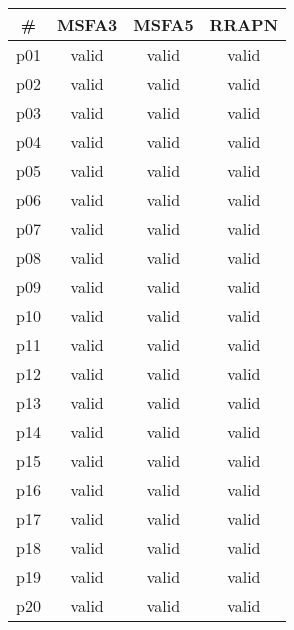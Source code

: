 \begin{tabular}{c||c|c|c}
\textbf{\#} & \textbf{MSFA3} & \textbf{MSFA5} & \textbf{RRAPN}\\
\hline
\hline
p01 & valid & valid & valid\\
p02 & valid & valid & valid\\
p03 & valid & valid & valid\\
p04 & valid & valid & valid\\
p05 & valid & valid & valid\\
p06 & valid & valid & valid\\
p07 & valid & valid & valid\\
p08 & valid & valid & valid\\
p09 & valid & valid & valid\\
p10 & valid & valid & valid\\
p11 & valid & valid & valid\\
p12 & valid & valid & valid\\
p13 & valid & valid & valid\\
p14 & valid & valid & valid\\
p15 & valid & valid & valid\\
p16 & valid & valid & valid\\
p17 & valid & valid & valid\\
p18 & valid & valid & valid\\
p19 & valid & valid & valid\\
p20 & valid & valid & valid\\
\end{tabular}

